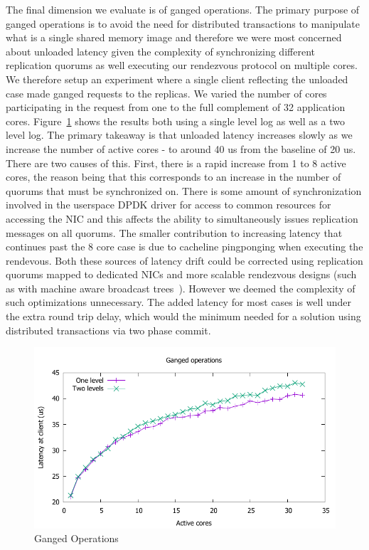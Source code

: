 \documentclass[10pt, preprint, nonatbib]{sigplanconf}
\begin{document}
The final dimension we evaluate is of ganged operations. The primary purpose of
ganged operations is to avoid the need for distributed transactions to
manipulate what is a single shared memory image and therefore we were most
concerned about unloaded latency given the complexity of synchronizing different
replication quorums as well executing our rendezvous protocol on multiple
cores. We therefore setup an experiment where a single client reflecting the
unloaded case made ganged requests to the replicas. We varied the number of
cores participating in the request from one to the full complement of 32
application cores. Figure~\ref{fig:ganged} shows the results both using a single
level log as well as a two level log. The primary takeaway is that unloaded
latency increases slowly as we increase the number of active cores - to around
40 us from the baseline of 20 us. There are two causes of this. First, there is
a rapid increase from 1 to 8 active cores, the reason being that this
corresponds to an increase in the number of quorums that must be synchronized
on. There is some amount of synchronization involved in the userspace DPDK
driver for access to common resources for accessing the NIC and this affects the
ability to simultaneously issues replication messages on all quorums. The
smaller contribution to increasing latency that continues past the 8 core case
is due to cacheline pingponging when executing the rendevous. Both these sources
of latency drift could be corrected using replication quorums mapped to
dedicated NICs and more scalable rendezvous designs (such as with machine aware
broadcast trees~\cite{broadcast_tree}). However we deemed the complexity of such
optimizations unnecessary. The added latency for most cases is well under the
extra round trip delay, which would the minimum needed for a solution using
distributed transactions via two phase commit.

\begin{figure}
\includegraphics[scale=0.6]{results2/multi.pdf}
\caption{Ganged Operations}
\label{fig:ganged}
\end{figure}
\end{document}
